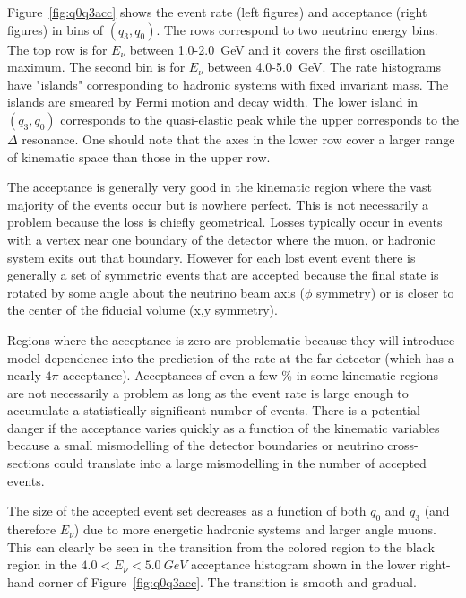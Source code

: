 Figure~\ref{fig:q0q3acc} shows the event rate (left figures) and acceptance (right figures) in bins of $(q_3,q_0)$. The rows correspond to two neutrino energy bins. The top row is for $E_\nu$ between \num{1.0}-\SI{2.0}{GeV} and it covers the first oscillation maximum. The second bin is for $E_\nu$ between \num{4.0}-\SI{5.0}{GeV}.  The rate histograms have "islands" corresponding to hadronic systems with fixed invariant mass. The islands are smeared by Fermi motion and decay width. The lower island in $(q_3,q_0)$ corresponds to the quasi-elastic peak while the upper corresponds to the $\Delta$ resonance. One should note that the axes in the lower row cover a larger range of kinematic space than those in the upper row. 

The acceptance is generally very good in the kinematic region where the vast majority of the events occur but is nowhere perfect. This is not necessarily a problem because the loss is chiefly geometrical. Losses typically occur in events with a vertex near one boundary of the detector where the muon, or hadronic system exits out that boundary.  However for each lost event event there is generally a set of symmetric events that are accepted because the final state is rotated by some angle about the neutrino beam axis ($\phi$ symmetry) or is closer to the center of the fiducial volume (x,y symmetry).

Regions where the acceptance is zero are problematic because they will introduce model dependence into the prediction of the rate at the far detector (which has a nearly $4\pi$ acceptance). Acceptances of even a few \% in some kinematic regions are not necessarily a problem as long as the event rate is large enough to accumulate a statistically significant number of events. %
There is a potential danger if the acceptance varies quickly as a function of the kinematic variables because a small mismodelling of the detector boundaries or neutrino cross-sections could translate into a large mismodelling in the number of accepted events. 

The size of the accepted event set decreases as a function of both $q_0$ and $q_3$ (and therefore $E_\nu$) due to more energetic hadronic systems and larger angle muons. This can clearly be seen in the transition from the colored region to the black region in the $\num{4.0} < E_\nu < \SI{5.0}{GeV}$ acceptance histogram shown in the lower right-hand corner of Figure~\ref{fig:q0q3acc}. The transition is smooth and gradual. %

